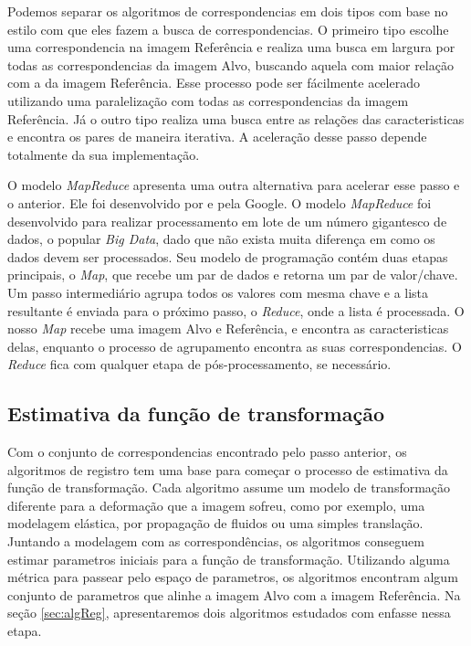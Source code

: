     Podemos separar os algoritmos de correspondencias em dois tipos com base no estilo com que eles fazem a busca de 
correspondencias. O primeiro tipo escolhe uma correspondencia na imagem Referência e realiza uma busca em largura por
todas as correspondencias da imagem Alvo, buscando aquela com maior relação com a da imagem Referência. Esse processo
pode ser fácilmente acelerado utilizando uma paralelização com todas as correspondencias da imagem Referência. Já o outro
tipo realiza uma busca entre as relações das caracteristicas e encontra os pares de maneira iterativa. A aceleração
desse passo depende totalmente da sua implementação.

    O modelo \textit{MapReduce} apresenta uma outra alternativa para acelerar esse passo e o anterior. Ele foi 
desenvolvido por \cite{dean2008mapreduce} e pela Google. O modelo \textit{MapReduce} foi desenvolvido para realizar 
processamento em lote de um número gigantesco de dados, o popular \textit{Big Data}, dado que não exista muita diferença 
em como os dados devem ser processados. Seu modelo de programação contém duas etapas principais, o \textit{Map}, que 
recebe um par de dados e retorna um par de valor/chave. Um passo intermediário agrupa todos os valores com mesma chave e
a lista resultante é enviada para o próximo passo, o \textit{Reduce}, onde a lista é processada. O nosso \textit{Map} 
recebe uma imagem Alvo e Referência, e encontra as caracteristicas delas, enquanto o processo de agrupamento encontra as
suas correspondencias. O \textit{Reduce} fica com qualquer etapa de pós-processamento, se necessário.
\subsection{Estimativa da função de transformação}
    
    Com o conjunto de correspondencias encontrado pelo passo anterior, os algoritmos de registro tem uma base para 
começar o processo de estimativa da função de transformação. Cada algoritmo assume um modelo de transformação diferente
para a deformação que a imagem sofreu, como por exemplo, uma modelagem elástica, por propagação de fluidos ou uma
simples translação. Juntando a modelagem com as correspondências, os algoritmos conseguem estimar parametros iniciais
para a função de transformação. Utilizando alguma métrica para passear pelo espaço de parametros, os algoritmos encontram
algum conjunto de parametros que alinhe a imagem Alvo com a imagem Referência. Na seção \ref{sec:algReg}, apresentaremos
dois algoritmos estudados com enfasse nessa etapa.


